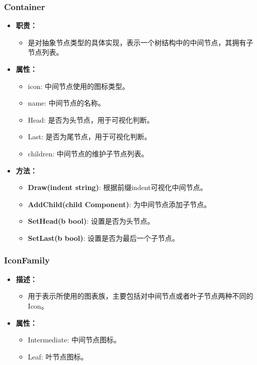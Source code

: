 \documentclass[hyperref,a4paper,UTF8]{ctexart}
\begin{document}
\subsubsection{Container}
\begin{itemize}
    \item \textbf{职责：}
    \begin{itemize}
        \item 是对抽象节点类型的具体实现，表示一个树结构中的中间节点，其拥有子节点列表。
    \end{itemize}
    \item \textbf{属性：}
    \begin{itemize}
        \item icon: 中间节点使用的图标类型。
        \item name: 中间节点的名称。
        \item Head: 是否为头节点，用于可视化判断。
        \item Last: 是否为尾节点，用于可视化判断。
        \item children: 中间节点的维护子节点列表。
    \end{itemize}
    \item \textbf{方法：}
    \begin{itemize}
        \item \textbf{Draw(indent string)}: 根据前缀indent可视化中间节点。
        \item \textbf{AddChild(child Component)}: 为中间节点添加子节点。
        \item \textbf{SetHead(b bool)}: 设置是否为头节点。
        \item \textbf{SetLast(b bool)}: 设置是否为最后一个子节点。
    \end{itemize}
\end{itemize}

\subsubsection{IconFamily}
\begin{itemize}
    \item \textbf{描述：}
    \begin{itemize}
        \item 用于表示所使用的图表族，主要包括对中间节点或者叶子节点两种不同的Icon。
    \end{itemize}
    \item \textbf{属性：}
    \begin{itemize}
        \item Intermediate: 中间节点图标。
        \item Leaf: 叶节点图标。
    \end{itemize}
\end{itemize}
\end{document}
